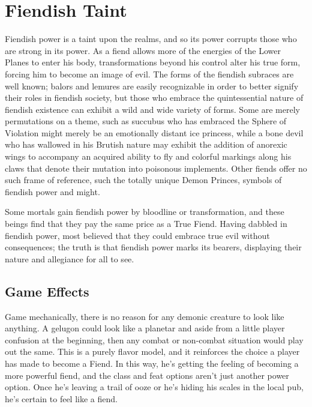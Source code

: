 
\section{Fiendish Taint}

Fiendish power is a taint upon the realms, and so its power corrupts those who are strong in its power. As a fiend allows more of the energies of the Lower Planes to enter his body, transformations beyond his control alter his true form, forcing him to become an image of evil. The forms of the fiendish subraces are well known; balors and lemures are easily recognizable in order to better signify their roles in fiendish society, but those who embrace the quintessential nature of fiendish existence can exhibit a wild and wide variety of forms. Some are merely permutations on a theme, such as succubus who has embraced the Sphere of Violation might merely be an emotionally distant ice princess, while a bone devil who has wallowed in his Brutish nature may exhibit the addition of anorexic wings to accompany an acquired ability to fly and colorful markings along his claws that denote their mutation into poisonous implements. Other fiends offer no such frame of reference, such the totally unique Demon Princes, symbols of fiendish power and might.

Some mortals gain fiendish power by bloodline or transformation, and these beings find that they pay the same price as a True Fiend. Having dabbled in fiendish power, most believed that they could embrace true evil without consequences; the truth is that fiendish power marks its bearers, displaying their nature and allegiance for all to see.

\subsection{Game Effects} Game mechanically, there is no reason for any demonic creature to look like anything. A gelugon could look like a planetar and aside from a little player confusion at the beginning, then any combat or non-combat situation would play out the same. This is a purely flavor model, and it reinforces the choice a player has made to become a Fiend. In this way, he's getting the feeling of becoming a more powerful fiend, and the class and feat options aren't just another power option. Once he's leaving a trail of ooze or he's hiding his scales in the local pub, he's certain to feel like a fiend.

